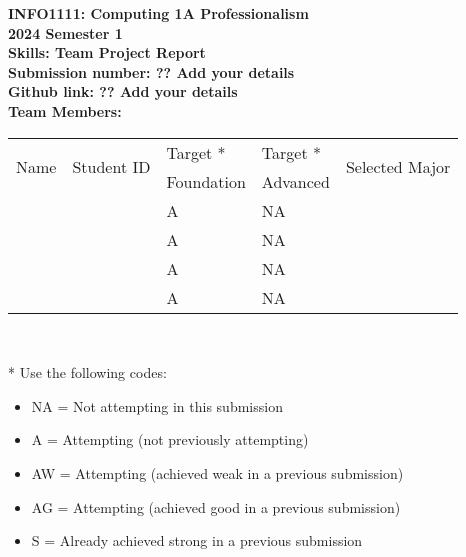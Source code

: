 \documentclass[a4paper, 11pt]{report}
\begin{document}
\begin{titlepage}
\begin{flushright}
\end{flushright}

\begin{centering}
\textbf{\huge INFO1111: Computing 1A Professionalism}\\[0.75cm]
\textbf{\huge 2024 Semester 1}\\[2cm]
\textbf{\huge Skills: Team Project Report}\\[2cm]

\textbf{\large Submission number: ?? Add your details}\\[0.5cm]
\textbf{\large Github link: ?? Add your details}\\[0.75cm]
\textbf{\huge Team Members:}\\[0.75cm]

\begin{tabular}{|p{}|p{}|p{}|p{}|p{}|}
	\hline
	\multirow{2}{*}{Name} & \multirow{2}{*}{Student ID} & Target * & Target * & \multirow{2}{*}{Selected Major} \\
	 & & Foundation & Advanced & \\
	\hline
	\hline
	\raggedright{\studA} & \sidA & A & NA & \majA \\
	\hline
	\raggedright{\studB} & \sidB & A & NA & \majB \\
	\hline
	\raggedright{\studC} & \sidC & A & NA & \majC \\
	\hline
	\raggedright{\studD} & \sidD & A & NA & \majD \\
	\hline
\end{tabular}
\\[0.5cm]
\end{centering}

* Use the following codes:
\begin{itemize}
\setlength\itemsep{0em}
\item NA = Not attempting in this submission
\item A = Attempting (not previously attempting)
\item AW = Attempting (achieved weak in a previous submission) 
\item AG = Attempting (achieved good in a previous submission)
\item S = Already achieved strong in a previous submission
\end{itemize}

\thispagestyle{empty}
\end{titlepage}
\end{document}
